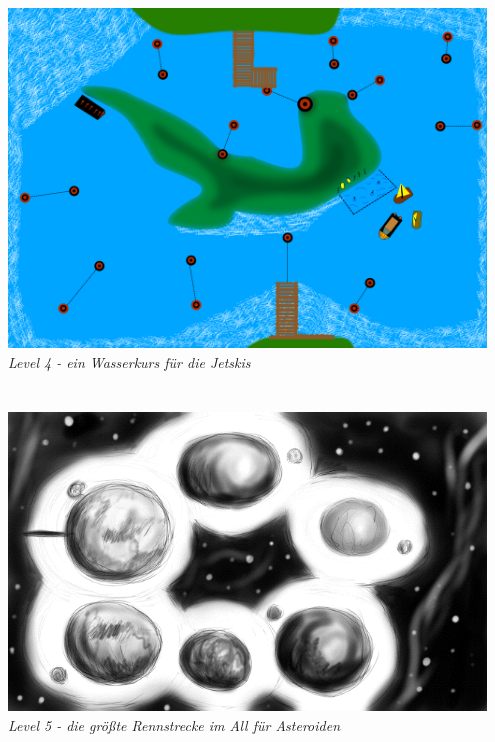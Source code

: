 \begin{flushright}
\includegraphics[width=0.95\textwidth]{img/wasserkurs.png}\\
\textit{Level 4 - ein Wasserkurs für die Jetskis}\\
\ \\
\ \\
\includegraphics[width=0.95\textwidth]{img/asteroiden.png}\\
\textit{Level 5 - die größte Rennstrecke im All für Asteroiden}

\end{flushright}
